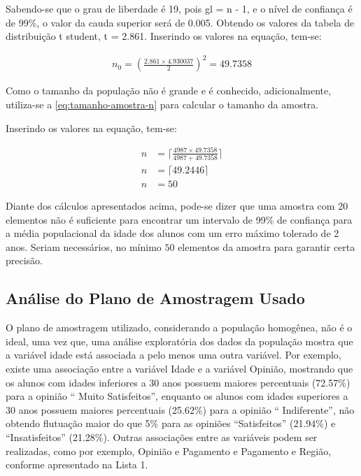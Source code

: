 	Sabendo-se que o grau de liberdade é 19, pois gl = n - 1, e o nível de
	confiança é de 99\%, o valor da cauda superior será de \num{0,005}. Obtendo os
	valores da tabela de distribuição t student, t = \num{2,861}.
	Inserindo os valores na equação, tem-se:

	\begin{align*}
		n_0 = \left (\frac{\num{2,861} \times \num{4,930037}}{2} \right)^2 = \num{49,7358}
	\end{align*}

	Como o tamanho da população não é grande e é conhecido, adicionalmente,
	utiliza-se a \autoref{eq:tamanho-amostra-n} para calcular o tamanho da amostra.

	Inserindo os valores na equação, tem-se:

	\begin{align*}
		n &= \Big\lceil \frac{4987 \times \num{49,7358}}{4987 + \num{49,7358}} \Big\rceil \\
		n &= \lceil \num{49,2446} \rceil \\
		n &= 50
	\end{align*}

	Diante dos cálculos apresentados acima, pode-se dizer que uma amostra
	com 20 elementos não é suficiente para encontrar um intervalo de 99\% de
	confiança para a média populacional da idade dos alunos com um erro
	máximo tolerado de 2 anos. Seriam necessários, no mínimo $50$ elementos da
	amostra para garantir certa precisão. 

\subsection{Análise do Plano de Amostragem Usado}
	
	
	O plano de amostragem utilizado, considerando a população homogênea, não é o ideal, 
	uma vez que, uma análise exploratória dos dados da população mostra que a variável idade está associada 
	a pelo menos uma outra variável. Por exemplo, existe uma
	associação entre a variável Idade e a variável Opinião, mostrando que os
	alunos com idades inferiores a 30 anos possuem maiores percentuais
	(\num{72,57}\%) para a opinião `` Muito Satisfeitos'', enquanto os 
    alunos com idades superiores
	a 30 anos possuem maiores percentuais (\num{25,62}\%) para a opinião
    `` Indiferente'', não obtendo flutuação
	maior do que 5\% para as opiniões ``Satisfeitos'' (\num{21,94}\%) 
    e ``Insatisfeitos'' (\num{21,28}\%). Outras associações entre as variáveis podem ser realizadas, como por exemplo, 
       Opinião e Pagamento e Pagamento e Região, conforme apresentado na Lista 1. 

